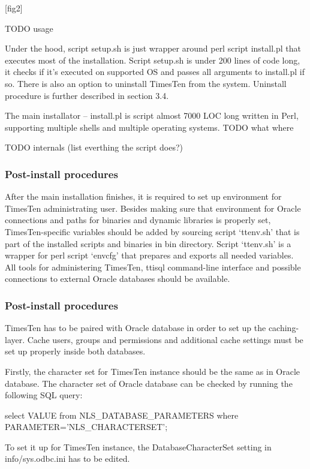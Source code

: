 \documentclass[11pt, letterpaper]{article}            %
\begin{document}
[fig2]

TODO usage

Under the hood, script setup.sh is just wrapper around perl script install.pl that executes most of the installation. Script setup.sh is under 200 lines of code long, it checks if it’s executed on supported OS and passes all arguments to install.pl if so. There is also an option to uninstall TimesTen from the system. Uninstall procedure is further described in section 3.4.

The main installator – install.pl is script almost 7000 LOC long written in Perl, supporting multiple shells and multiple operating systems. TODO what where

TODO internals (list everthing the script does?)

\subsubsection{Post-install procedures}

After the main installation finishes, it is required to set up environment for TimesTen administrating user. Besides making sure that environment for Oracle connections and paths for binaries and dynamic libraries is properly set, TimesTen-specific variables should be added by sourcing script ‘ttenv.sh’ that is part of the installed scripts and binaries in bin directory. Script ‘ttenv.sh’ is a wrapper for perl script ‘envcfg’ that prepares and exports all needed variables. All tools for administering TimesTen, ttisql command-line interface and possible connections to external Oracle databases should be available.

\subsubsection{Post-install procedures}

TimesTen has to be paired with Oracle database in order to set up the caching-layer. Cache users, groups and permissions  and additional cache settings must be set up properly inside both databases.

Firstly, the character set for TimesTen instance should be the same as in Oracle database. The character set of Oracle database can be checked by running the following SQL query:

                select VALUE from NLS_DATABASE_PARAMETERS where PARAMETER='NLS_CHARACTERSET';

To set it up for TimesTen instance, the DatabaseCharacterSet setting in info/sys.odbc.ini has to be edited.
\end{document}

